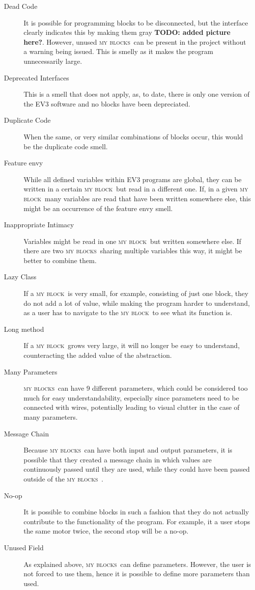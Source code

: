 \documentclass{sig-alternate}
\newcommand{\todo}[1]{\textbf{TODO: #1}}
\newcommand{\mbs}{\textsc{my blocks}}
\newcommand{\mb}{\textsc{my block}}
\begin{document}
\begin{description}
\item[Dead Code] It is possible for programming blocks to be disconnected, but the interface clearly indicates this by making them gray \todo{added picture here?}. However, unused \mbs~can be present in the project without a warning being issued. This is smelly as it makes the program unnecessarily large.
\item[Deprecated Interfaces] This is a smell that does not apply, as, to date, there is only one version of the EV3 software and no blocks have been depreciated.
\item[Duplicate Code] When the same, or very similar combinations of blocks occur, this would be the duplicate code smell.
\item[Feature envy] While all defined variables within EV3 programs are global, they can be written in a certain \mb~but read in a different one. If, in a given \mb~many variables are read that have been written somewhere else, this might be an occurrence of the feature envy smell. 
\item[Inappropriate Intimacy] Variables might be read in one \mb~but written somewhere else. If there are two \mbs~sharing multiple variables this way, it might be better to combine them.
\item[Lazy Class] If a \mb~is very small, for example, consisting of just one block, they do not add a lot of value, while making the program harder to understand, as a user has to navigate to the \mb~to see what its function is.
\item[Long method] If a \mb~grows very large, it will no longer be easy to understand, counteracting the added value of the abstraction.
\item[Many Parameters] \mbs~can have 9 different parameters, which could be considered too much for easy understandability, especially since parameters need to be connected with wires, potentially leading to visual clutter in the case of many parameters.
\item[Message Chain] Because \mbs~can have both input and output parameters, it is possible that they created a message chain in which values are continuously passed until they are used, while they could have been passed outside of the \mbs~.
\item[No-op] It is possible to combine blocks in such a fashion that they do not actually contribute to the functionality of the program. For example, it a user stops the same motor twice, the second stop will be a no-op.
\item[Unused Field] As explained above, \mbs~can define parameters. However, the user is not forced to use them, hence it is possible to define more parameters than used.

\end{description}
\end{document}
